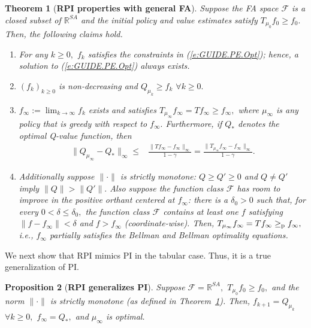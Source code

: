 \documentclass[twoside]{article}
\theoremstyle{plain}
\newtheorem{theorem}{Theorem}[section]
\newtheorem{proposition}[theorem]{Proposition}
\theoremstyle{definition}
\theoremstyle{remark}
\newcommand{\QS}{Q_*}
\newcommand{\bR}{\mathbb{R}}
\newcommand{\cF}{\mathcal{F}}
\newcommand{\gep}{\geq_{\textnormal{p}}}
\renewcommand{\eqref}[1]{(\ref{#1})}
\begin{document}
\begin{theorem}[\textbf{RPI properties with general FA}]
    \label{thm:RPI.FA} 
    Suppose the FA space $\cF$ is a closed subset of $\bR^{SA}$ and the initial policy and value estimates satisfy $T_{\mu_0} f_0 \geq f_0.$ Then, the following claims hold.
    \begin{enumerate}[leftmargin=*]
        \item For any $k \geq 0,$ $f_k$ satisfies the constraints in (\ref{e:GUIDE.PE.Opt}); hence, a solution to \eqref{e:GUIDE.PE.Opt} always exists. 

        \item $(f_k)_{k \geq 0}$ is 
        non-decreasing and $Q_{\mu_k} \geq f_k$  $ \forall k \geq 0.$ 
                
        \item $f_\infty := \lim_{k \to \infty} f_k$ exists and satisfies $T_{\mu_\infty} f_\infty = T f_\infty \geq f_\infty,$ where $\mu_\infty$ is any policy that is greedy with respect to $f_\infty.$ Furthermore, if $\QS$ denotes the optimal Q-value function, then
        \begin{align*}
            \|Q_{\mu_\infty} - \QS\|_\infty \leq {} & \frac{\|T f_\infty - f_\infty\|_\infty}{1 - \gamma} 
            = {} \frac{\|T_{\mu_\infty} f_\infty - f_\infty\|_\infty}{1 - \gamma}.
        \end{align*}

        \item Additionally suppose $\|\cdot\|$ is strictly monotone: $Q \geq Q' \geq 0$ and $Q \neq Q'$ imply $\|Q\| > \|Q'\|.$ Also suppose the function class $\cF$ has room to improve in the positive orthant centered at $f_\infty$: there is a $\delta_0 > 0$ such that, for every $0 < \delta \leq \delta_0,$ the function class $\cF$ contains at least one $f$ satisfying $\|f - f_\infty\| < \delta$ and $f > f_\infty$ (coordinate-wise). Then, $T_{\mu_\infty} f_\infty = T f_\infty \gep f_\infty,$ i.e., $f_\infty$ partially satisfies the Bellman and Bellman optimality equations.
    \end{enumerate}
\end{theorem}

We next show that RPI mimics PI in the tabular case. Thus, it is a true generalization of PI.

\begin{proposition}[\textbf{RPI generalizes PI}]
\label{prop:RPI.PI.generalization}
%
Suppose $\cF = \bR^{SA},$ $T_{\mu_0} f_0 \geq f_0,$ and the norm $\|\cdot\|$ is strictly monotone (as defined in Theorem~\ref{thm:RPI.FA}). Then, $f_{k + 1} = Q_{\mu_k}$ $\forall k \geq 0,$ $f_\infty = \QS,$ and $\mu_\infty$ is  optimal.  
%
\end{proposition}
\end{document}
